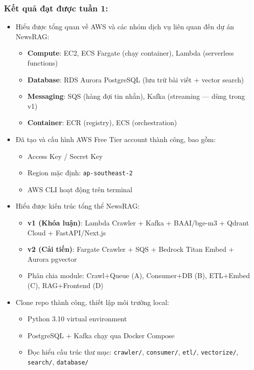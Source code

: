 \hypertarget{kux1ebft-quux1ea3-ux111ux1ea1t-ux111ux1b0ux1ee3c-tuux1ea7n-1}{%
\subsubsection{Kết quả đạt được tuần
1:}}

\begin{itemize}
\tightlist
\item
  Hiểu được tổng quan về AWS và các nhóm dịch vụ liên quan đến dự án
  NewsRAG:

  \begin{itemize}
  \tightlist
  \item
    \textbf{Compute}: EC2, ECS Fargate (chạy container), Lambda
    (serverless functions)
  \item
    \textbf{Database}: RDS Aurora PostgreSQL (lưu trữ bài viết + vector
    search)
  \item
    \textbf{Messaging}: SQS (hàng đợi tin nhắn), Kafka (streaming ---
    dùng trong v1)
  \item
    \textbf{Container}: ECR (registry), ECS (orchestration)
  \end{itemize}
\item
  Đã tạo và cấu hình AWS Free Tier account thành công, bao gồm:

  \begin{itemize}
  \tightlist
  \item
    Access Key / Secret Key
  \item
    Region mặc định: \texttt{ap-southeast-2}
  \item
    AWS CLI hoạt động trên terminal
  \end{itemize}
\item
  Hiểu được kiến trúc tổng thể NewsRAG:

  \begin{itemize}
  \tightlist
  \item
    \textbf{v1 (Khóa luận)}: Lambda Crawler + Kafka + BAAI/bge-m3 +
    Qdrant Cloud + FastAPI/Next.js
  \item
    \textbf{v2 (Cải tiến)}: Fargate Crawler + SQS + Bedrock Titan Embed
    + Aurora pgvector
  \item
    Phân chia module: Crawl+Queue (A), Consumer+DB (B), ETL+Embed (C),
    RAG+Frontend (D)
  \end{itemize}
\item
  Clone repo thành công, thiết lập môi trường local:

  \begin{itemize}
  \tightlist
  \item
    Python 3.10 virtual environment
  \item
    PostgreSQL + Kafka chạy qua Docker Compose
  \item
    Đọc hiểu cấu trúc thư mục: \texttt{crawler/}, \texttt{consumer/},
    \texttt{etl/}, \texttt{vectorize/}, \texttt{search/},
    \texttt{database/}
  \end{itemize}
\end{itemize}
